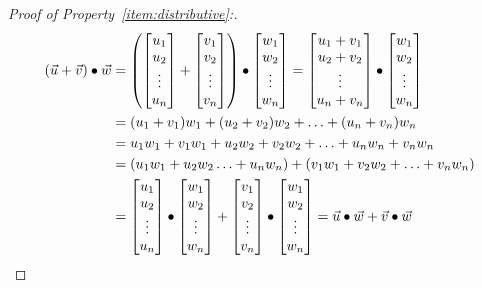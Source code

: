 \documentclass{ximera}
\begin{document}
\begin{proof}[Proof of Property~\ref{item:distributive}:]
 
\begin{align*}
\left(\vec{u}+\vec{v}\right)\bullet \vec{w}&=\left(\begin{bmatrix} u_1\\ u_2\\ \vdots\\ u_n \end{bmatrix}+\begin{bmatrix} v_1\\ v_2\\ \vdots\\ v_n \end{bmatrix}\right)\bullet \begin{bmatrix}w_1\\w_2\\\vdots\\w_n\end{bmatrix}=\begin{bmatrix}
u_1+v_1\\
u_2+v_2\\
\vdots\\
u_n+v_n
\end{bmatrix}\bullet \begin{bmatrix}w_1\\w_2\\\vdots\\w_n\end{bmatrix}\\
&=(u_1+v_1)w_1+
(u_2+v_2)w_2+
\ldots+
(u_n+v_n)w_n\\
&=u_1w_1+v_1w_1+
u_2w_2+v_2w_2+
\ldots+
u_nw_n+v_nw_n\\
&=(u_1w_1+
u_2w_2\ldots+u_nw_n)+(v_1w_1+v_2w_2+
\ldots
+v_nw_n)\\
&=\begin{bmatrix}
u_1\\
u_2\\
\vdots\\
u_n
\end{bmatrix}\bullet\begin{bmatrix}w_1\\w_2\\\vdots\\w_n\end{bmatrix}+\begin{bmatrix}
v_1\\
v_2\\
\vdots\\
v_n
\end{bmatrix}\bullet \begin{bmatrix}w_1\\w_2\\\vdots\\w_n\end{bmatrix}
=\vec{u}\bullet\vec{w}+\vec{v}\bullet\vec{w}
\end{align*}
\end{proof}
 
\end{document}
